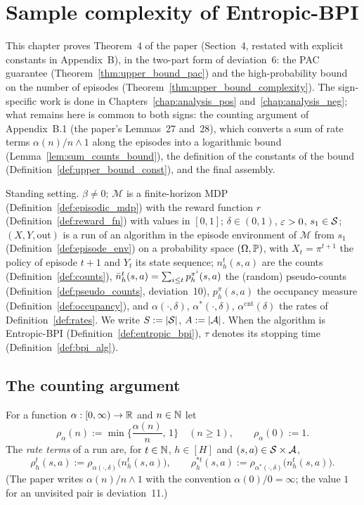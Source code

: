 \chapter{Sample complexity of Entropic-BPI}
\label{chap:sample_complexity}

This chapter proves Theorem~4 of the paper (Section~4, restated with explicit constants in
Appendix~B), in the two-part form of deviation~6: the PAC guarantee
(Theorem~\ref{thm:upper_bound_pac}) and the high-probability bound on the number of episodes
(Theorem~\ref{thm:upper_bound_complexity}). The sign-specific work is done in
Chapters~\ref{chap:analysis_pos} and~\ref{chap:analysis_neg}; what remains here is common to
both signs: the counting argument of Appendix~B.1 (the paper's Lemmas~27 and~28), which
converts a sum of rate terms $\alpha(n)/n \wedge 1$ along the episodes into a logarithmic
bound (Lemma~\ref{lem:sum_counts_bound}), the definition of the constants of the bound
(Definition~\ref{def:upper_bound_const}), and the final assembly.

Standing setting. $\beta \ne 0$; $\mathcal M$ is a finite-horizon MDP (Definition~\ref{def:episodic_mdp})
with the reward function $r$ (Definition~\ref{def:reward_fn}) with values in $[0,1]$;
$\delta \in (0,1)$, $\varepsilon > 0$, $s_1 \in \mathcal{S}$; $(X, Y, \mathrm{out})$ is a run of an algorithm
in the episode environment of $\mathcal M$ from $s_1$ (Definition~\ref{def:episode_env}) on a
probability space $(\Omega, \mathbb{P})$, with $X_t = \pi^{t+1}$ the policy of episode $t + 1$ and
$Y_t$ its state sequence; $n_h^t(s,a)$ are the counts (Definition~\ref{def:counts}),
$\bar{n}_h^t(s,a) = \sum_{i \le t} p^{\pi^i}_h(s,a)$ the (random) pseudo-counts
(Definition~\ref{def:pseudo_counts}, deviation~10), $p^\pi_h(s,a)$ the occupancy measure
(Definition~\ref{def:occupancy}), and $\alpha(\cdot,\delta)$, $\alpha^*(\cdot,\delta)$,
$\alpha^{\mathrm{cnt}}(\delta)$ the rates of Definition~\ref{def:rates}. We write $S := \lvert \mathcal{S} \rvert$,
$A := \lvert \mathcal{A} \rvert$. When the algorithm is Entropic-BPI (Definition~\ref{def:entropic_bpi}), $\tau$
denotes its stopping time (Definition~\ref{def:bpi_alg}).

\section{The counting argument}
\label{sec:sc_counting}

\begin{definition}\label{def:rate_min}
\leanok
{}
For a function $\alpha : [0, \infty) \to \mathbb{R}$ and $n \in \mathbb{N}$ let
\[
  \rho_\alpha(n) := \min\Big\{\frac{\alpha(n)}{n},\, 1\Big\} \quad (n \ge 1), \qquad \rho_\alpha(0) := 1 .
\]
The \emph{rate terms} of a run are, for $t \in \mathbb{N}$, $h \in [H]$ and $(s,a) \in \mathcal{S}\times\mathcal{A}$,
\[
  \rho^t_h(s,a) := \rho_{\alpha(\cdot,\delta)}\big(n_h^t(s,a)\big), \qquad
  \rho^{*t}_h(s,a) := \rho_{\alpha^*(\cdot,\delta)}\big(n_h^t(s,a)\big) .
\]
(The paper writes $\alpha(n)/n \wedge 1$ with the convention $\alpha(0)/0 = \infty$; the value
$1$ for an unvisited pair is deviation~11.)
\end{definition}


